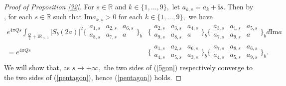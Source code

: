 \documentclass[11pt]{article}
\theoremstyle{remark}
\theoremstyle{remark}
\numberwithin{equation}{section}
\begin{document}
\begin{proof}[Proof of Proposition \ref{32}]
For $s\in \mathbb R$ and $k\in \{1,\dots, 9\},$ let $a_{k,s}=a_k+\mathbf is.$ Then by \cite[Proposition 6.1 (1)]{LMSWY}, for each $s\in \mathbb R$ such that $\mathrm{Im}a_{k,s}>0$ for each $k\in\{1,\dots,9\},$
 we have 
\begin{equation}\label{5gon}
\begin{split}
e^{4\pi Qs}\int_{ \frac{Q}{2}+\mathbf{i}\mathbb R_{>0}}|S_b(2a)|^2\bigg\{\begin{matrix} 
    a_{1,s} & a_{2,s} & a_{6,s}\\
      a_{8,s} & a_{7,s} & a 
   \end{matrix}\bigg\}_b
  & \bigg\{\begin{matrix} 
    a_{2,s} & a_{3,s} & a_{4,s}\\
      a_{9,s} & a_{8,s} & a 
   \end{matrix}\bigg\}_b
 \bigg\{\begin{matrix} 
    a_{3,s} & a_{1,s} & a_{5,s}\\
      a_{7,s} & a_{9,s} & a 
   \end{matrix}\bigg\}_b
   d\mathrm{Im}a\\
   =  e^{4\pi Qs} & \bigg\{\begin{matrix} 
    a_{1,s} & a_{2,s} & a_{6,s}\\
      a_{4,s} & a_{5,s} & a_{3,s} 
   \end{matrix}\bigg\}_b
   \bigg\{\begin{matrix} 
   a_{7,s} & a_{8,s} & a_{6,s}\\
      a_{4,s} & a_{5,s} & a_{9,s} 
   \end{matrix}\bigg\}_b.   
\end{split}
\end{equation}
We will show that, as $s\to +\infty,$ the two sides of (\ref{5gon}) respectively converge to the two sides of (\ref{pentagon}), hence (\ref{pentagon}) holds. 
\medskip




\end{proof}
\end{document}
